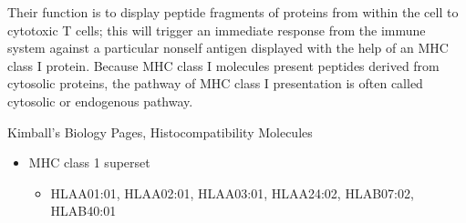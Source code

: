 \documentclass[letterpaper,10pt,english]{jupyterBook}
\begin{document}
\sphinxAtStartPar
Their function is to display peptide fragments of proteins from within the cell to cytotoxic T cells; this will trigger an immediate response from the immune system against a particular non\sphinxhyphen{}self antigen displayed with the help of an MHC class I protein. Because MHC class I molecules present peptides derived from cytosolic proteins, the pathway of MHC class I presentation is often called cytosolic or endogenous pathway.%
\begin{footnote}[1]\sphinxAtStartFootnote
Kimball’s Biology Pages, Histocompatibility Molecules
%
\end{footnote}
\begin{itemize}
\item {} 
\sphinxAtStartPar
MHC class 1 superset
\begin{itemize}
\item {} 
\sphinxAtStartPar
HLA\sphinxhyphen{}A01:01, HLA\sphinxhyphen{}A02:01, HLA\sphinxhyphen{}A03:01, HLA\sphinxhyphen{}A24:02, HLA\sphinxhyphen{}B07:02, HLA\sphinxhyphen{}B40:01

\end{itemize}

\end{itemize}
\end{document}
